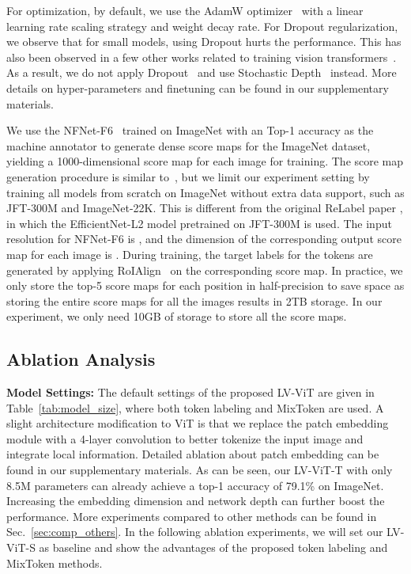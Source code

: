 \documentclass{article}
\newcommand{\myPara}[1]{\noindent\textbf{#1:}}
\begin{document}
For optimization, by default, we use the AdamW optimizer~\cite{loshchilov2017decoupled} 
with a linear learning rate scaling strategy  and 
weight decay rate. 
For Dropout regularization, we observe that for small models, using Dropout hurts the performance.
This has also been observed in a few other works related to training vision transformers~\cite{touvron2020training, touvron2021going, yuan2021tokens}.
As a result, we do not apply Dropout~\cite{srivastava2014dropout} and use 
Stochastic Depth~\cite{huang2016deep} instead.
More details on hyper-parameters and finetuning can  be found in our supplementary materials.

We use the NFNet-F6~\cite{brock2021high} trained on ImageNet with an  Top-1 accuracy 
as the machine annotator to generate dense score maps for the ImageNet dataset,
yielding a 1000-dimensional score map for each image for training.
The score map generation procedure is similar to~\cite{yun2021relabel}, but 
we limit our experiment setting by training all models from scratch on ImageNet without extra data support, such as JFT-300M and ImageNet-22K.
This is different from the original ReLabel paper \cite{yun2021relabel}, 
in which the EfficientNet-L2 model pretrained on JFT-300M is used.
The input resolution for NFNet-F6 is , and the dimension of 
the corresponding output score map for each image 
is . 
During training, the target labels for the tokens are generated by applying RoIAlign~\cite{he2017mask} on the corresponding score map.
In practice, we only store the top-5 score maps for each position in half-precision to
save space as storing the entire score maps for all the images results in 2TB storage.
In our experiment, we only need 10GB of storage to store all the score maps.



\subsection{Ablation Analysis} \label{sec:ablation}

\myPara{Model Settings}
The default settings of the proposed LV-ViT are given in Table~\ref{tab:model_size}, where both token labeling and MixToken are used. 
A slight architecture modification to ViT \cite{dosovitskiy2020image} is that we replace the patch embedding module with a 4-layer convolution to better 
tokenize the input image and integrate local information.
Detailed ablation about patch embedding can be found in our supplementary materials.
As can be seen, our LV-ViT-T with only 8.5M parameters can already achieve
a top-1 accuracy of 79.1\% on ImageNet.
Increasing the embedding dimension and network depth can further boost the performance.
More experiments compared to other methods can be found in Sec.~\ref{sec:comp_others}.
In the following ablation experiments, we will set our LV-ViT-S as baseline and show
the advantages of the proposed token labeling and MixToken methods.
\end{document}
